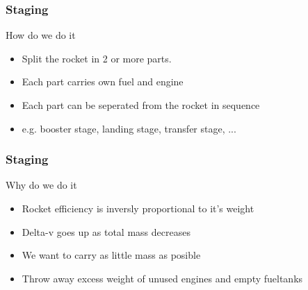 {
%
\begin{frame}
\end{frame}
\begin{frame}
    \frametitle{Staging}
    \begin{block}{How do we do it}
        \begin{itemize}
            \item Split the rocket in 2 or more parts.
            \item Each part carries own fuel and engine
            \item Each part can be seperated from the rocket in sequence
            \item e.g. booster stage, landing stage, transfer stage, ...
        \end{itemize}
    \end{block}
\end{frame}
\begin{frame}
    \frametitle{Staging}
    \begin{block}{Why do we do it}
        \begin{itemize}
            \item Rocket efficiency is inversly proportional to it's weight
            \item Delta-v goes up as total mass decreases
            \item We want to carry as little mass as posible
            \item Throw away excess weight of unused engines and empty fueltanks
        \end{itemize}
    \end{block}
\end{frame}
}
